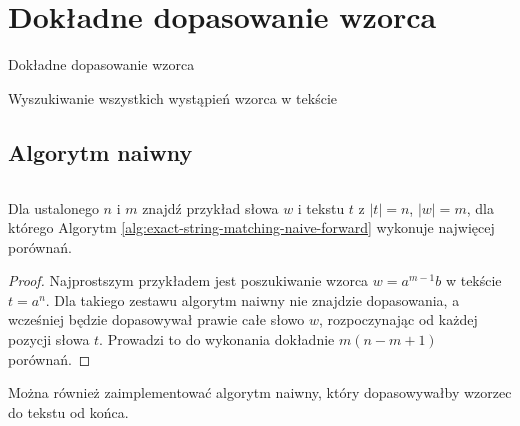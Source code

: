 \section{Dokładne dopasowanie wzorca}

\begin{algorithm}[H]
    \caption{Dokładne dopasowanie wzorca}
\end{algorithm}

\begin{algorithm}[H]
    \caption{Wyszukiwanie wszystkich wystąpień wzorca w tekście}
\end{algorithm}

\subsection{Algorytm naiwny}

\begin{code}
\inputminted{python}{code/exact-string-matching/naive-forward.py}
\label{alg:exact-string-matching-naive-forward}
\end{code}

\begin{problem}{}{}
  Dla ustalonego $n$ i $m$ znajdź przykład słowa $w$ i tekstu $t$ z $|t| = n$, $|w| = m$, dla którego Algorytm \ref{alg:exact-string-matching-naive-forward} wykonuje najwięcej porównań.
\end{problem}

\begin{proof}
Najprostszym przykładem jest poszukiwanie wzorca $w=a^{m-1}b$ w tekście $t=a^n$. Dla takiego zestawu algorytm naiwny nie znajdzie dopasowania, a wcześniej będzie dopasowywał prawie całe słowo $w$, rozpoczynając od każdej pozycji słowa $t$. Prowadzi to do wykonania dokładnie $m (n - m + 1)$ porównań.
\end{proof}

Można również zaimplementować algorytm naiwny, który dopasowywałby wzorzec do tekstu od końca.

\begin{code}
\inputminted{python}{code/exact-string-matching/naive-backward.py}
\label{alg:exact-string-matching-naive-backward}
\end{code}

